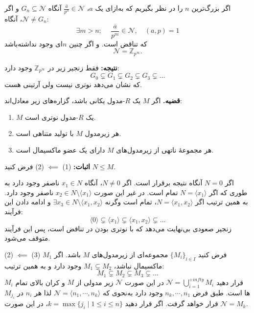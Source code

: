 اگر بزرگ‌ترین $n$ را در نظر بگیریم که به‌ازای یک ‌\(a\)، $\overline{\frac{a}{p^n}} \in \mathcal{N}$ آنگاه \(G_n \subseteq \mathcal{N}\) و اگر $\mathcal{N} \neq G_n$، آنگاه:
\[
    \exists m > n; \quad \ \overline{\frac{a}{p^m}} \in \mathcal{N}, \quad (a, p) = 1
\]
که تناقض است.
و اگر چنین
\(n\)ای
وجود نداشته‌باشد
$$\mathcal{N} = \mathbb{Z}_{p^\infty}.$$

\textbf{نتیجه:} فقط زنجیر زیر در $\mathbb{Z}_{p^\infty}$ وجود دارد:
\[
    G_0 \subsetneq G_1 \subsetneq G_2 \subsetneq G_3 \subsetneq \dots
\]
که نشان می‌دهد نوتری نیست ولی آرتینی هست.

\hrulefill




\textbf{قضیه.} اگر $M$ یک $R$-مدول یکانی باشد، گزاره‌های زیر معادل‌اند:
\begin{enumerate}
    \item $M$ یک $R$-مدول نوتری است.
    \item هر زیرمدول $M$ با تولید متناهی است.
    \item هر مجموعهٔ ناتهی از زیرمدول‌های $M$ دارای یک عضو ماکسیمال است.
\end{enumerate}


\textbf{اثبات:} (1) \(\impliedby \) (2)
فرض کنید $N \leq M$.

اگر $N = 0$ آنگاه نتیجه برقرار است.
اگر $N \neq 0$، آنگاه $ x_1 \in N$ ناصفر وجود دارد  به طوری که اگر
\(N = \langle x_1 \rangle \) تمام است.
در غیر این صورت $ x_2 \in N \setminus \langle x_1 \rangle$ ناصفر وجود دارد.
به همین ترتیب اگر $N = \langle x_1, x_2 \rangle$، تمام است وگرنه $\exists x_3 \in N \setminus \langle x_1, x_2 \rangle$ و ادامه دادن این فرآیند:
\[
    \langle 0 \rangle \subsetneq\langle x_1 \rangle \subsetneq \langle x_1, x_2 \rangle \subsetneq \dots
\]
زنجیر صعودی بی‌نهایت می‌دهد که با نوتری بودن در تناقض است، پس این فرآیند متوقف می‌شود.


\hrulefill



(2) \(\impliedby\) (3)
فرض کنید $\{ M_i \}_{i \in I}$ مجموعه‌ای از زیرمدول‌های $M$ باشد. اگر $M_1$ ماکسیمال نباشد، $M_1 \subsetneq M_2$ وجود دارد  و به همین ترتیب:
\[
    M_1 \subsetneq M_2 \subsetneq M_3 \subsetneq \dots
\]
قرار دهید
\(\mathcal{N} = \bigcup_{i=1}^{+infty} M_i\)
در این صورت
\(\mathcal{N}\)
زیر مدولی از
\(M\)
و
کران بالای تمام
\(M_i\)
ها است. طبق فرض
\(n_k, \cdots , n_1\)
وجود دارد به‌نحوی که
\(\mathcal{N} = \langle n_1, \cdots , n_k \rangle\)
لذا هر
\(n_i\)
در
\(M_{j_i}\)
قرار خواهد گرفت.
اگر قرار دهید
\(k = \max\{j_i \mid 1 \leqslant i \leqslant n\}\)،
در این صورت
\(\mathcal{N} = M_k\).


